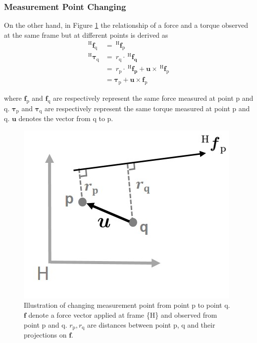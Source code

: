 \subsubsection{Measurement Point Changing}
\hspace{6mm}On the other hand, in Figure \ref{fig:sensor_comp2} the relationship of a force and a torque observed at the same frame but at different points is derived as
\begin{equation}
\begin{split}
^\mathrm{H}\boldsymbol{f}_\mathrm{q} &= \ ^\mathrm{H}\boldsymbol{f}_\mathrm{p}\\
^\mathrm{H}\boldsymbol{\tau}_\mathrm{q} 	&= \ r_\mathrm{q} \cdot \ ^\mathrm{H}\boldsymbol{f_q}\\
			 				&= \ r_\mathrm{p} \cdot \ ^\mathrm{H}\boldsymbol{f_p}+\boldsymbol{u} \times \ ^\mathrm{H}\boldsymbol{f}_\mathrm{p}\\
			 				&= \boldsymbol{\tau}_\mathrm{p} + \boldsymbol{u}\times \boldsymbol{f}_\mathrm{p}
\end{split}
\end{equation}
\par\noindent
where $\boldsymbol{f}_\mathrm{p}$ and $\boldsymbol{f}_\mathrm{q}$ are respectively represent the same force measured at point p and q. $\boldsymbol{\tau}_\mathrm{p}$ and $\boldsymbol{\tau}_\mathrm{q}$ are respectively represent the same torque measured at point p and q. $\boldsymbol{u}$ denotes the vector from q to p.
\begin{figure}[htbp]
\begin{center}
\includegraphics[width=0.65	\linewidth]{Images/sensor_comp 2.jpg}
\caption{
Illustration of changing measurement point from point p to point q. $\boldsymbol{f}$ denote a force vector applied at frame \{H\} and observed from point p and q. $r_{\mathrm{p}},r_{\mathrm{q}}$ are distances between point p, q and their projections on $\boldsymbol{f}$.
}\label{fig:sensor_comp2}
\end{center}
\end{figure}
